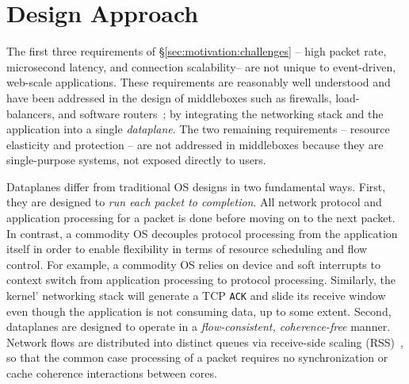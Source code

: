 \section{\ix Design Approach}
\label{sec:design}


The first three requirements of \S\ref{sec:motivation:challenges} --
high packet rate, microsecond latency, and connection scalability--
are not unique to event-driven, web-scale applications.  These
requirements are reasonably well understood and have been addressed in
the design of middleboxes such as firewalls,
load-balancers, and software
routers~\cite{DBLP:journals/tocs/KohlerMCJK00,DBLP:conf/sosp/DobrescuEACFIKMR09, missing-loadbalancers};
by integrating the networking stack and the application into a single
\emph{dataplane}. The two remaining requirements -- resource elasticity
and protection -- are not addressed in middleboxes because they
are single-purpose systems, not exposed directly to users.


Dataplanes differ from traditional OS designs in two fundamental
ways. First, they are designed to \emph{run each packet to
  completion}. All network protocol and application processing for a
packet is done before moving on to the next packet.  In contrast, a
commodity OS decouples protocol processing from the application itself
in order to enable flexibility in terms of resource scheduling and
flow control. For example, a commodity OS relies on device and soft
interrupts  to context switch from application processing to protocol
processing. Similarly, the kernel' networking stack will generate a
TCP \texttt{ACK} and slide its receive window even though the
application is not consuming data, up to some extent. Second,
dataplanes are designed to operate in a \emph{flow-consistent,
  coherence-free} manner.  Network flows are distributed into distinct
queues via receive-side scaling
(RSS)~\cite{DBLP:journals/computer/RegnierMIIMHNCF04}, so that the
common case processing of a packet requires no synchronization or
cache coherence interactions between cores.

